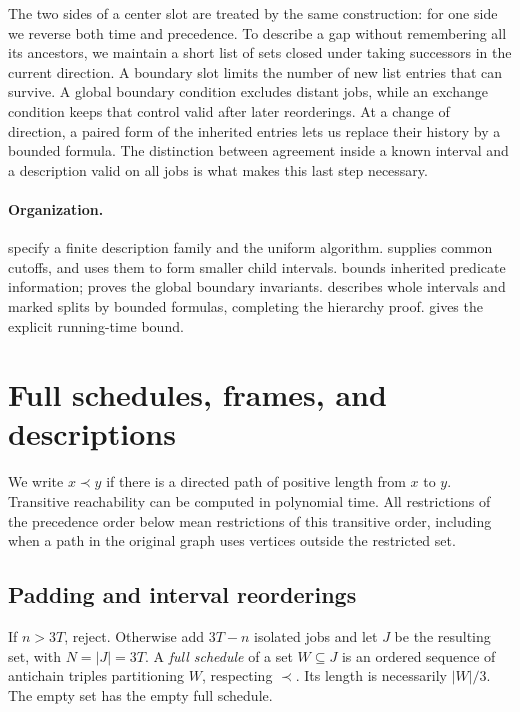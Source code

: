 \documentclass[11pt]{article}
\numberwithin{equation}{section}
\theoremstyle{definition}
\theoremstyle{remark}
\begin{document}
The two sides of a center slot are treated by the same construction:
for one side we reverse both time and precedence. To describe a gap
without remembering all its ancestors, we maintain a short list of sets
closed under taking successors in the current direction. A boundary slot limits the number of new list entries that can
survive. A global boundary condition excludes distant jobs, while an
exchange condition keeps that control valid after later reorderings.
At a change of direction, a paired form of the inherited entries lets us
replace their history by a bounded formula. The distinction between
agreement inside a known interval and a description valid on all jobs is
what makes this last step necessary.

\paragraph{Organization.}
 specify a finite description family
and the uniform algorithm.  supplies common cutoffs,
and  uses them to form smaller child intervals.
 bounds inherited predicate information;
 proves the global boundary invariants.
 describes whole intervals and marked
splits by bounded formulas, completing the hierarchy proof.
 gives the explicit running-time bound.

\section{Full schedules, frames, and descriptions}\label{sec:preliminaries}

We write \(x\prec y\) if there is a directed path of positive length
from \(x\) to \(y\). Transitive reachability can be computed in polynomial
time. All restrictions of the precedence order below mean restrictions of
this transitive order, including when a path in the original graph uses
vertices outside the restricted set.

\subsection{Padding and interval reorderings}

If \(n>3T\), reject. Otherwise add \(3T-n\) isolated jobs and let \(J\)
be the resulting set, with \(N=|J|=3T\).
A \emph{full schedule} of a set \(W\subseteq J\) is an ordered sequence
of antichain triples partitioning \(W\), respecting \(\prec\).
Its length is necessarily \(|W|/3\). The empty set has the empty full
schedule.
\end{document}
